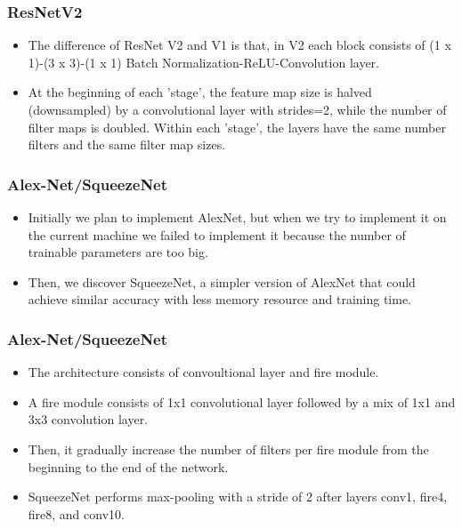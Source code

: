 \documentclass{beamer}
\begin{document}
\begin{frame}\frametitle{ResNetV2}
\begin{itemize}
	\item  The difference of ResNet V2 and V1 is that, in V2 each block consists of  (1 x 1)-(3 x 3)-(1 x 1) Batch Normalization-ReLU-Convolution layer. 
	\item At the beginning of each 'stage', the feature map size is halved (downsampled) by a convolutional layer with strides=2, while the number of filter maps is doubled. Within each 'stage', the layers have the same number filters and the
	same filter map sizes. 
\end{itemize} 
\end{frame}
\begin{frame}\frametitle{Alex-Net/SqueezeNet}
\begin{itemize}
	\item Initially we plan to implement AlexNet, but when we try to implement it on the current machine we failed to implement it because the number of trainable parameters are too big. 
	\item Then, we discover SqueezeNet, a simpler version of AlexNet that could achieve similar accuracy with less memory resource and training time. 
\end{itemize} 
\end{frame}
\begin{frame}\frametitle{Alex-Net/SqueezeNet}
\begin{itemize}
	\item The architecture consists of convoultional layer and fire module.  
	\item  A fire module consists of 1x1 convolutional layer followed by a mix of 1x1 and 3x3 convolution layer.
	\item Then, it gradually increase the number of filters per fire module from the beginning to the end of the network.
	\item SqueezeNet performs max-pooling with a stride of 2 after layers conv1, fire4, fire8, and conv10.
\end{itemize} 
\end{frame}
\end{document}
